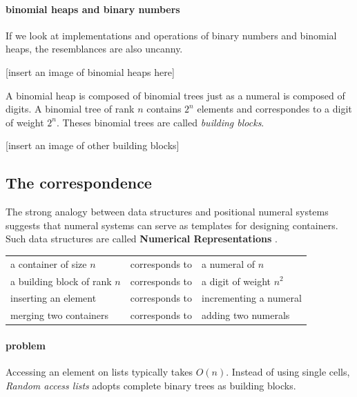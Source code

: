\documentclass[../thesis.tex]{subfiles}
\begin{document}
\paragraph{binomial heaps and binary numbers}

If we look at implementations and operations of binary numbers and binomial
heaps, the resemblances are also uncanny.

[insert an image of binomial heaps here]

A binomial heap is composed of binomial trees just as a numeral is composed
of digits. A binomial tree of rank $ n $ contains $ 2^n $ elements and
correspondes to a digit of weight $ 2^n $.
Theses binomial trees are called \textit{building blocks}.

[insert an image of other building blocks]


\subsection{The correspondence}

The strong analogy between data structures and positional numeral systems
suggests that numeral systems can serve as templates for designing containers.
Such data structures are called \textbf{Numerical Representations}\cite{okasaki1996purely}
\cite{hinze1998numerical}.

\begin{center}
    \begin{adjustbox}{max width=\textwidth}
    \begin{tabular}{ l l l }
    a container of size $ n $ & corresponds to & a numeral of $ n $ \\
    a building block of rank $ n $ & corresponds to & a digit of weight $ n^2 $ \\
    inserting an element      & corresponds to & incrementing a numeral \\
    merging two containers    & corresponds to & adding two numerals \\
    \end{tabular}
    \end{adjustbox}
\end{center}

\paragraph{problem}

Accessing an element on lists typically takes $ O(n) $.
Instead of using single cells, \textit{Random access lists} adopts complete
binary trees as building blocks.
\end{document}

